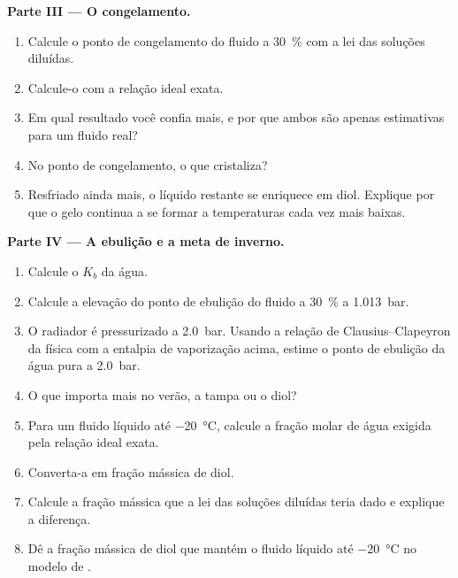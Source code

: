 \begin{problem}
\medskip
\noindent\textbf{Parte III --- O congelamento.}
\begin{enumerate}[resume]
  \item Calcule o ponto de congelamento do fluido a \qty{30}{\percent} com a
        lei das soluções diluídas.
  \item Calcule-o com a relação ideal exata.
  \item Em qual resultado você confia mais, e por que ambos são apenas
        estimativas para um fluido real?
  \item No ponto de congelamento, o que cristaliza?
  \item Resfriado ainda mais, o líquido restante se enriquece em diol. Explique
        por que o gelo continua a se formar a temperaturas cada vez mais baixas.
\end{enumerate}

\medskip
\noindent\textbf{Parte IV --- A ebulição e a meta de inverno.}
\begin{enumerate}[resume]
  \item Calcule o $K_b$ da água.
  \item Calcule a elevação do ponto de ebulição do fluido a \qty{30}{\percent}
        a \qty{1.013}{bar}.
  \item O radiador é pressurizado a \qty{2.0}{bar}. Usando a relação de
        Clausius--Clapeyron da física com a entalpia de vaporização acima,
        estime o ponto de ebulição da água pura a \qty{2.0}{bar}.
  \item O que importa mais no verão, a tampa ou o diol?
  \item Para um fluido líquido até \qty{-20}{\celsius}, calcule a fração
        molar de água exigida pela relação ideal exata.
  \item Converta-a em fração mássica de diol.
  \item Calcule a fração mássica que a lei das soluções diluídas teria dado e
        explique a diferença.
  \item Dê a fração mássica de diol que mantém o fluido líquido até
        \qty{-20}{\celsius} no modelo de .
\end{enumerate}
\end{problem}
